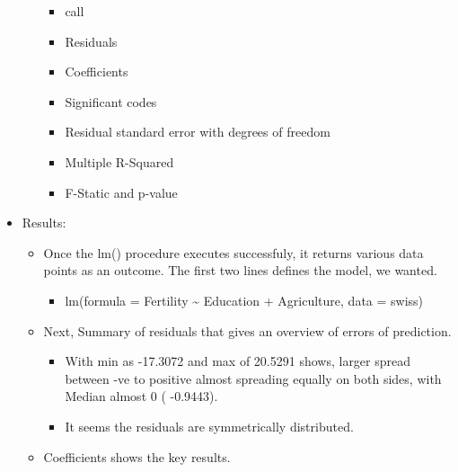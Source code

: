 \documentclass[]{article}
\providecommand{\tightlist}{%
  \setlength{\itemsep}{0pt}\setlength{\parskip}{0pt}}
\begin{document}
\begin{itemize}
\begin{itemize}
    \begin{itemize}
    \tightlist
    \item
      call
    \item
      Residuals
    \item
      Coefficients
    \item
      Significant codes
    \item
      Residual standard error with degrees of freedom
    \item
      Multiple R-Squared
    \item
      F-Static and p-value
    \end{itemize}
  \end{itemize}
\item
  Results:

  \begin{itemize}
  \tightlist
  \item
    Once the lm() procedure executes successfuly, it returns various
    data points as an outcome. The first two lines defines the model, we
    wanted.

    \begin{itemize}
    \tightlist
    \item
      lm(formula = Fertility \textasciitilde{} Education + Agriculture,
      data = swiss)
    \end{itemize}
  \item
    Next, Summary of residuals that gives an overview of errors of
    prediction.

    \begin{itemize}
    \tightlist
    \item
      With min as -17.3072 and max of 20.5291 shows, larger spread
      between -ve to positive almost spreading equally on both sides,
      with Median almost 0 ( -0.9443).
    \item
      It seems the residuals are symmetrically distributed.
    \end{itemize}
  \item
    Coefficients shows the key results.


\end{itemize}
\end{itemize}
\end{document}
